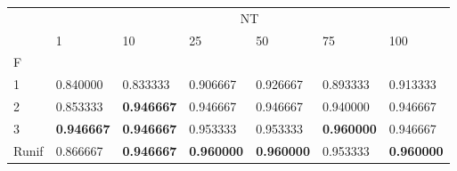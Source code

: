 \begin{table}[htbp]
\centering
\label{iris-results}
\begin{tabular}{lllllll}
\toprule
 & \multicolumn{6}{c}{NT} \\
 & 1 & 10 & 25 & 50 & 75 & 100 \\
F &  &  &  &  &  &  \\
\midrule
1 & 0.840000 & 0.833333 & 0.906667 & 0.926667 & 0.893333 & 0.913333 \\
2 & 0.853333 & \textbf{0.946667} & 0.946667 & 0.946667 & 0.940000 & 0.946667 \\
3 & \textbf{0.946667} & \textbf{0.946667} & 0.953333 & 0.953333 & \textbf{0.960000} & 0.946667 \\
Runif & 0.866667 & \textbf{0.946667} & \textbf{0.960000} & \textbf{0.960000} & 0.953333 & \textbf{0.960000} \\
\bottomrule
\end{tabular}
\end{table}
